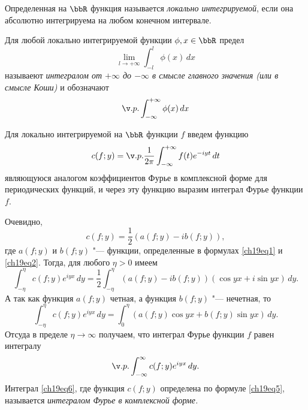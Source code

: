 \begin{defn}
Определенная на $\bbR$ функция называется \textit{локально интегрируемой}, если она абсолютно интегрируема на любом конечном интервале.
\end{defn}
\begin{defn}
Для любой локально интегрируемой функции $\phi, x \in \bbR$ предел
$$
\lim_{l \to +\infty}\int_{-l}^{l} \phi(x)\,dx
$$
называеют \textit{интегралом от $+\infty$ до $-\infty$ в смысле главного значения (или в смысле Коши)} и обозначают
$$
\v.p.\int_{-\infty}^{+\infty} \phi(x)\,dx
$$
\end{defn}

Для локально интегрируемой на $\bbR$ функции $f$ введем функцию
\begin{equation} \label{ch19eq5}
c(f;y)=\v.p.\frac{1}{2\pi}\int_{-\infty}^{+\infty} f(t)e^{-iyt}\,dt
\end{equation}
являющуюся аналогом коэффициентов Фурье в комплексной форме для периодических функций, и через эту функцию выразим интеграл Фурье функции $f$.

Очевидно,
$$
c(f;y) = \frac12 (a(f;y) - ib(f;y)),
$$
где $a(f;y)$ и $b(f;y)$ "--- функции, определенные в формулах \eqref{ch19eq1} и \eqref{ch19eq2}. Тогда, для любого $\eta > 0$ имеем
$$
\int_{-\eta}^{\eta} c(f;y)e^{iyx}\,dy = \frac12 \int_{-\eta}^{\eta} (a(f;y) - ib(f;y))(\cos yx + i\sin yx)\,dy.
$$
А так как функция $a(f;y)$ четная, а функция $b(f;y)$ "--- нечетная, то
$$
\int_{-\eta}^{\eta} c(f;y)e^{iyx}\,dy = \int_{0}^{\eta}(a(f;y)\cos yx + b(f;y)\sin yx)\,dy.
$$
Отсуда в пределе $\eta \to \infty$ получаем, что интеграл Фурье функции $f$ равен интегралу
\begin{equation} \label{ch19eq6}
\v.p. \int_{-\infty}^{\infty} c(f;y)e^{iyx}\,dy.
\end{equation}
Интеграл \eqref{ch19eq6}, где функция $c(f;y)$ определена по формуле \eqref{ch19eq5}, называется \textit{интегралом Фурье в комплексной форме.}

